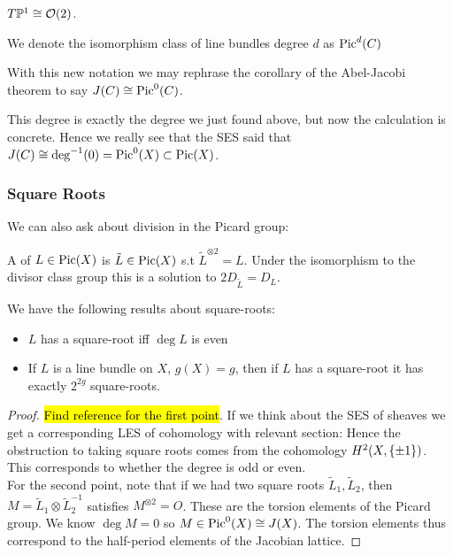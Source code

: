 \documentclass{article}
\begin{document}
\begin{example}
	$T\mathbb{P}^1 \cong \mathcal{O}(2)$. 
\end{example}


\begin{notation}
	We denote the isomorphism class of line bundles degree $d$ as $\operatorname{Pic}^d(C)$
\end{notation}

\begin{remark}
	With this new notation we may rephrase the corollary of the Abel-Jacobi theorem to say $J(C) \cong \operatorname{Pic}^0(C)$. 
\end{remark}

\begin{remark}
	This degree is exactly the degree we just found above, but now the calculation is concrete. Hence we really see that the SES said that $J(C) \cong \deg^{-1}(0) =\operatorname{Pic}^0(X) \subset \operatorname{Pic}(X)$.
\end{remark}

\subsubsection{Square Roots}
We can also ask about division in the Picard group:

\begin{definition}
	A  of $L \in \operatorname{Pic}(X)$ is $\tilde{L} \in \operatorname{Pic}(X)$ s.t $\tilde{L}^{\otimes 2}= L$. Under the isomorphism to the divisor class group this is a solution to $2D_{\tilde{L}} = D_L$. 
\end{definition}


\begin{prop}\label{prop:square roots of line bundles}
	We have the following results about square-roots:
	\begin{itemize}
		\item $L$ has a square-root iff $\deg L$ is even
		\item If $L$ is a line bundle on $X$, $g(X)=g$, then if $L$ has a square-root it has exactly $2^{2g}$ square-roots. 
	\end{itemize}
\end{prop}
\begin{proof}
	\hl{Find reference for the first point}. If we think about the SES of sheaves 
	we get a corresponding LES of cohomology with relevant section:
	Hence the obstruction to taking square roots comes from the cohomology $H^2(X,\left\{ \pm 1 \right\})$. This corresponds to whether the degree is odd or even. \\
	For the second point, note that if we had two square roots $\tilde{L}_1, \tilde{L}_2$, then $M=\tilde{L}_1 \otimes \tilde{L}_2^{-1}$ satisfies $M^{\otimes 2}=O$. These are the torsion elements of the Picard group. We know $\deg M=0$ so $M \in \operatorname{Pic}^0(X) \cong J(X)$. The torsion elements thus correspond to the half-period elements of the Jacobian lattice. 
\end{proof}
\end{document}
